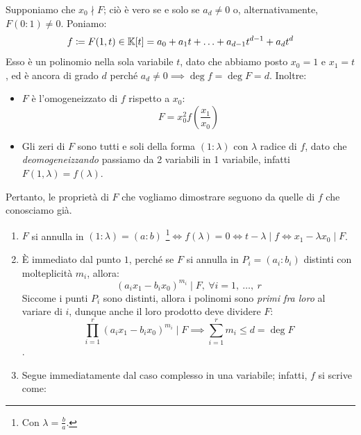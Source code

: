 \begin{demonstration}
	Supponiamo che $x_0 \nmid F$; ciò è vero se e solo se $a_d\neq 0$ o, alternativamente, $F(0\colon 1)\neq 0$. Poniamo:
	\begin{equation}
		f\coloneqq F(1,t)\in\mathbb{K}[t] = a_0+a_1t+\ldots+a_{d-1}t^{d-1}+a_dt^d
	\end{equation}
	Esso è un polinomio nella sola variabile $t$, dato che abbiamo posto $x_0=1$ e $x_1=t$, ed è ancora di grado $d$ perché $a_d\neq 0\implies \deg f=\deg F=d$. Inoltre:
		\begin{itemize}
			\item $F$ è l'omogeneizzato di $f$ rispetto a $x_0$:
			\begin{equation*}
				F=x_0^2f\left( \frac{x_1}{x_0} \right)
			\end{equation*}
			\item Gli zeri di $F$ sono tutti e soli della forma $(1\colon\lambda)$ con $\lambda$ radice di $f$, dato che \textit{deomogeneizzando} passiamo da 2 variabili in 1 variabile, infatti $F(1,\lambda)=f(\lambda)$.
		\end{itemize}
	Pertanto, le proprietà di $F$ che vogliamo dimostrare seguono da quelle di $f$ che conosciamo già.
		\begin{enumerate}[label=\Roman*]
			\item $F$ si annulla in $(1\colon\lambda)=(a\colon b)$ \footnote{Con $\lambda=\frac{b}{a}$.}$\iff f(\lambda)=0 \iff t-\lambda \mid f \iff x_1-\lambda x_0\mid F$. %
			\item È immediato dal punto $1$, perché se $F$ si annulla in $P_i=(a_i\colon b_i)$ distinti con molteplicità $m_i$, allora:
			\begin{equation*}
				(a_ix_1-b_ix_0)^{m_i} \mid F,\ \forall i=1,\ \ldots,\ r
			\end{equation*}
			Siccome i punti $P_i$ sono distinti, allora i polinomi sono \textit{primi fra loro} al variare di $i$, dunque anche il loro prodotto deve dividere $F$:
			 \begin{equation*}
			 	\prod_{i=1}^r (a_ix_1-b_ix_0)^{m_i}\mid F \implies \sum_{i=1}^r m_i\leq d=\deg F
			 \end{equation*}.
			\item Segue immediatamente dal caso complesso in una variabile; infatti, $f$ si scrive come:
			\begin{equation*}

\end{equation*}
\end{enumerate}
\end{demonstration}
